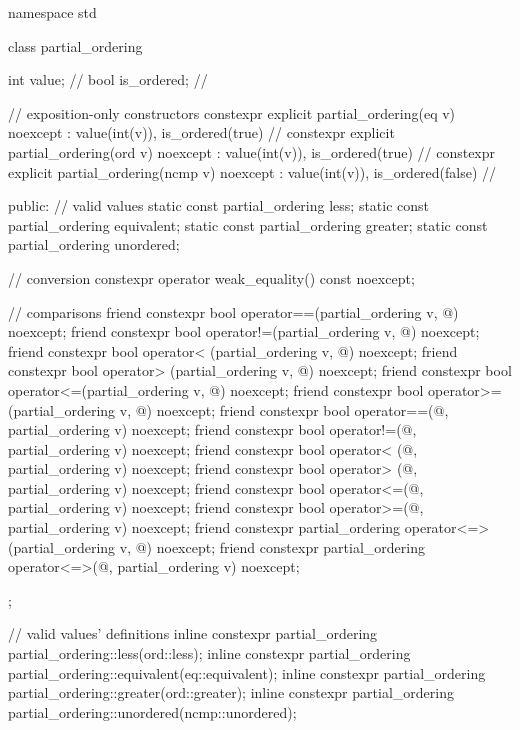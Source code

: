 %
%
%
%
%
\begin{codeblock}
namespace std {
  class partial_ordering {
    int value;          // \expos
    bool is_ordered;    // \expos

    // exposition-only constructors
    constexpr explicit
      partial_ordering(eq v) noexcept : value(int(v)), is_ordered(true) {}      // \expos
    constexpr explicit
      partial_ordering(ord v) noexcept : value(int(v)), is_ordered(true) {}     // \expos
    constexpr explicit
      partial_ordering(ncmp v) noexcept : value(int(v)), is_ordered(false) {}   // \expos

  public:
    // valid values
    static const partial_ordering less;
    static const partial_ordering equivalent;
    static const partial_ordering greater;
    static const partial_ordering unordered;

    // conversion
    constexpr operator weak_equality() const noexcept;

    // comparisons
    friend constexpr bool operator==(partial_ordering v, @\unspec@) noexcept;
    friend constexpr bool operator!=(partial_ordering v, @\unspec@) noexcept;
    friend constexpr bool operator< (partial_ordering v, @\unspec@) noexcept;
    friend constexpr bool operator> (partial_ordering v, @\unspec@) noexcept;
    friend constexpr bool operator<=(partial_ordering v, @\unspec@) noexcept;
    friend constexpr bool operator>=(partial_ordering v, @\unspec@) noexcept;
    friend constexpr bool operator==(@\unspec@, partial_ordering v) noexcept;
    friend constexpr bool operator!=(@\unspec@, partial_ordering v) noexcept;
    friend constexpr bool operator< (@\unspec@, partial_ordering v) noexcept;
    friend constexpr bool operator> (@\unspec@, partial_ordering v) noexcept;
    friend constexpr bool operator<=(@\unspec@, partial_ordering v) noexcept;
    friend constexpr bool operator>=(@\unspec@, partial_ordering v) noexcept;
    friend constexpr partial_ordering operator<=>(partial_ordering v, @\unspec@) noexcept;
    friend constexpr partial_ordering operator<=>(@\unspec@, partial_ordering v) noexcept;
  };

  // valid values' definitions
  inline constexpr partial_ordering partial_ordering::less(ord::less);
  inline constexpr partial_ordering partial_ordering::equivalent(eq::equivalent);
  inline constexpr partial_ordering partial_ordering::greater(ord::greater);
  inline constexpr partial_ordering partial_ordering::unordered(ncmp::unordered);
}
\end{codeblock}

